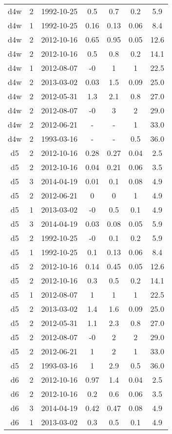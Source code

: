 \begin{table*}[htp]
\begin{tabular}{ccccccc}
d4w & 2 & 1992-10-25 & 0.5 & 0.7 & 0.2 & 5.9 \\
d4w & 1 & 1992-10-25 & 0.16 & 0.13 & 0.06 & 8.4 \\
d4w & 2 & 2012-10-16 & 0.65 & 0.95 & 0.05 & 12.6 \\
d4w & 2 & 2012-10-16 & 0.5 & 0.8 & 0.2 & 14.1 \\
d4w & 1 & 2012-08-07 & -0 & 1 & 1 & 22.5 \\
d4w & 2 & 2013-03-02 & 0.03 & 1.5 & 0.09 & 25.0 \\
d4w & 2 & 2012-05-31 & 1.3 & 2.1 & 0.8 & 27.0 \\
d4w & 2 & 2012-08-07 & -0 & 3 & 2 & 29.0 \\
d4w & 2 & 2012-06-21 & - & - & 1 & 33.0 \\
d4w & 2 & 1993-03-16 & - & - & 0.5 & 36.0 \\
d5 & 2 & 2012-10-16 & 0.28 & 0.27 & 0.04 & 2.5 \\
d5 & 2 & 2012-10-16 & 0.04 & 0.21 & 0.06 & 3.5 \\
d5 & 3 & 2014-04-19 & 0.01 & 0.1 & 0.08 & 4.9 \\
d5 & 2 & 2012-06-21 & 0 & 0 & 1 & 4.9 \\
d5 & 1 & 2013-03-02 & -0 & 0.5 & 0.1 & 4.9 \\
d5 & 3 & 2014-04-19 & 0.03 & 0.08 & 0.05 & 5.9 \\
d5 & 2 & 1992-10-25 & -0 & 0.1 & 0.2 & 5.9 \\
d5 & 1 & 1992-10-25 & 0.1 & 0.13 & 0.06 & 8.4 \\
d5 & 2 & 2012-10-16 & 0.14 & 0.45 & 0.05 & 12.6 \\
d5 & 2 & 2012-10-16 & 0.3 & 0.5 & 0.2 & 14.1 \\
d5 & 1 & 2012-08-07 & 1 & 1 & 1 & 22.5 \\
d5 & 2 & 2013-03-02 & 1.4 & 1.6 & 0.09 & 25.0 \\
d5 & 2 & 2012-05-31 & 1.1 & 2.3 & 0.8 & 27.0 \\
d5 & 2 & 2012-08-07 & -0 & 2 & 2 & 29.0 \\
d5 & 2 & 2012-06-21 & 1 & 2 & 1 & 33.0 \\
d5 & 2 & 1993-03-16 & 1 & 2.9 & 0.5 & 36.0 \\
d6 & 2 & 2012-10-16 & 0.97 & 1.4 & 0.04 & 2.5 \\
d6 & 2 & 2012-10-16 & 0.2 & 0.6 & 0.06 & 3.5 \\
d6 & 3 & 2014-04-19 & 0.42 & 0.47 & 0.08 & 4.9 \\
d6 & 1 & 2013-03-02 & 0.3 & 0.5 & 0.1 & 4.9 \\

\end{tabular}
\end{table*}
